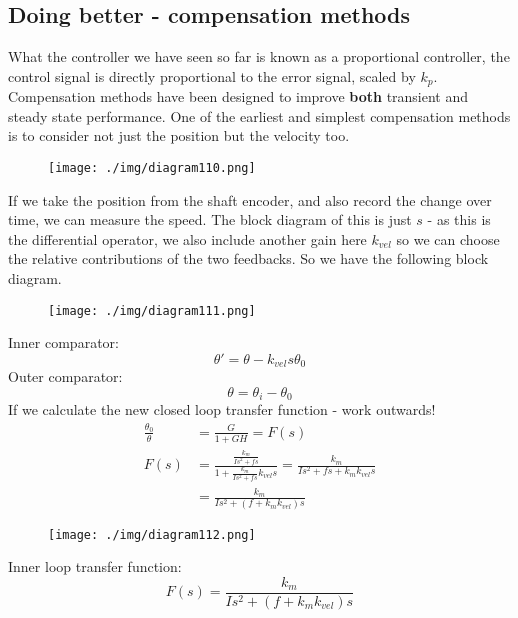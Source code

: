 \subsection{Doing better - compensation methods}
What the controller we have seen so far is known as a proportional controller, the control signal is directly proportional to the error signal, scaled by $k_p$. Compensation methods have been designed to improve \textbf{both} transient and steady state performance. One of the earliest and simplest compensation methods is to consider not just the position but the velocity too.
\begin{figure}[H]
  \centerline{\texttt{[image: ./img/diagram110.png]}}
  \caption{}
\end{figure}
If we take the position from the shaft encoder, and also record the change over time, we can measure the speed. The block diagram of this is just $s$ - as this is the differential operator, we also include another gain here $k_{vel}$ so we can choose the relative contributions of the two feedbacks. So we have the following block diagram.
\begin{figure}[H]
  \centerline{\texttt{[image: ./img/diagram111.png]}}
  \caption{}
\end{figure}
Inner comparator:
\begin{equation}
  \theta ' = \theta - k_{vel} s \theta_0
\end{equation}
Outer comparator:
\begin{equation}
  \theta = \theta_i - \theta_0
\end{equation}
If we calculate the new closed loop transfer function - work outwards!
\begin{align}
  \frac{\theta_0}{\theta} & = \frac{G}{1 +GH} = F(s)                                                                                  \\
  F(s)                    & = \frac{\frac{k_m}{Is^2 + fs}}{1 + \frac{k_m}{Is^2 + fs}k_{vel} s} = \frac{k_m}{Is^2 + fs + k_m k_{vel}s} \\
                          & = \frac{k_m}{Is^2 + \left(f + k_m k_{vel}\right) s}
\end{align}
\begin{figure}[H]
  \centerline{\texttt{[image: ./img/diagram112.png]}}
  \caption{}
\end{figure}
Inner loop transfer function:
\begin{equation}
  F(s) = \frac{k_m}{Is^2 + \left(f + k_m k_{vel}\right) s}
\end{equation}
